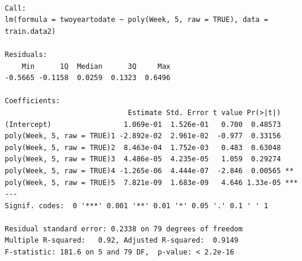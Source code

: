 \documentclass[
  letterpaper,
  DIV=11,
  numbers=noendperiod]{scrreport}
\newenvironment{Shaded}{\begin{snugshade}}{\end{snugshade}}
\newcommand{\AttributeTok}[1]{\textcolor[rgb]{0.40,0.45,0.13}{#1}}
\newcommand{\CommentTok}[1]{\textcolor[rgb]{0.37,0.37,0.37}{#1}}
\newcommand{\ConstantTok}[1]{\textcolor[rgb]{0.56,0.35,0.01}{#1}}
\newcommand{\DecValTok}[1]{\textcolor[rgb]{0.68,0.00,0.00}{#1}}
\newcommand{\FloatTok}[1]{\textcolor[rgb]{0.68,0.00,0.00}{#1}}
\newcommand{\FunctionTok}[1]{\textcolor[rgb]{0.28,0.35,0.67}{#1}}
\newcommand{\NormalTok}[1]{\textcolor[rgb]{0.00,0.23,0.31}{#1}}
\newcommand{\OtherTok}[1]{\textcolor[rgb]{0.00,0.23,0.31}{#1}}
\newcommand{\SpecialCharTok}[1]{\textcolor[rgb]{0.37,0.37,0.37}{#1}}
\begin{document}
\begin{Shaded}
\end{Shaded}

\begin{verbatim}

Call:
lm(formula = twoyeartodate ~ poly(Week, 5, raw = TRUE), data = train.data2)

Residuals:
    Min      1Q  Median      3Q     Max 
-0.5665 -0.1158  0.0259  0.1323  0.6496 

Coefficients:
                             Estimate Std. Error t value Pr(>|t|)    
(Intercept)                 1.069e-01  1.526e-01   0.700  0.48573    
poly(Week, 5, raw = TRUE)1 -2.892e-02  2.961e-02  -0.977  0.33156    
poly(Week, 5, raw = TRUE)2  8.463e-04  1.752e-03   0.483  0.63048    
poly(Week, 5, raw = TRUE)3  4.486e-05  4.235e-05   1.059  0.29274    
poly(Week, 5, raw = TRUE)4 -1.265e-06  4.444e-07  -2.846  0.00565 ** 
poly(Week, 5, raw = TRUE)5  7.821e-09  1.683e-09   4.646 1.33e-05 ***
---
Signif. codes:  0 '***' 0.001 '**' 0.01 '*' 0.05 '.' 0.1 ' ' 1

Residual standard error: 0.2338 on 79 degrees of freedom
Multiple R-squared:   0.92, Adjusted R-squared:  0.9149 
F-statistic: 181.6 on 5 and 79 DF,  p-value: < 2.2e-16
\end{verbatim}
\end{document}
